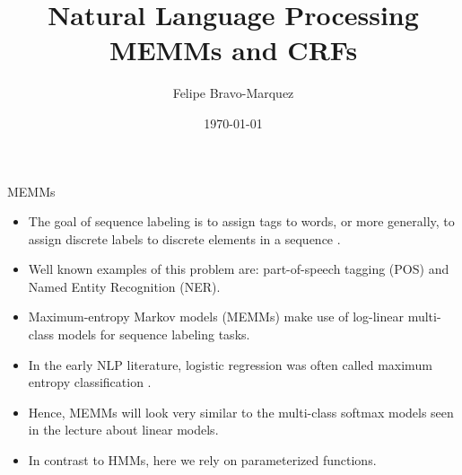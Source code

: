 \documentclass[handout]{beamer}
\title{Natural Language Processing \\ MEMMs and CRFs}
\author[Felipe Bravo Márquez]{\footnotesize
 \textcolor[rgb]{0.00,0.00,1.00}{Felipe Bravo-Marquez}}
\date{\today}
\begin{document}
\begin{frame}
\titlepage


\end{frame}


\begin{frame}{MEMMs}
\begin{scriptsize}
\begin{itemize}

\item The goal of sequence labeling is to assign tags to words, or more generally, to assign discrete labels to discrete elements in a sequence \cite{jacobbook}.

\item Well known examples of this problem are: part-of-speech tagging (POS) and Named Entity Recognition (NER).

\item Maximum-entropy Markov models (MEMMs) make use of log-linear multi-class models for sequence labeling tasks.
 
 \item In the early NLP literature, logistic regression was often called maximum entropy classification \cite{jacobbook}.
 
 \item Hence, MEMMs will look very similar to the multi-class softmax models seen in the lecture about linear models. 
 
  \item In contrast to HMMs, here we rely on parameterized functions.

\end{itemize}


\end{scriptsize}
\end{frame}
\end{document}

